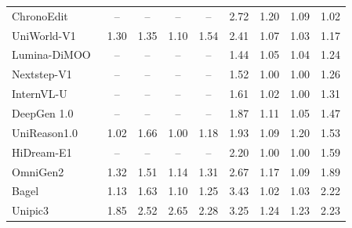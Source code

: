 \documentclass{llmxive}
\begin{document}
\begin{table}[t]
{\begin{tabular}{l|cccc|cccc}
            ChronoEdit~\cite{wu2025chronoedit}
            & -- & -- & -- & --
            & 2.72 & 1.20 & 1.09
            & \cellcolor[HTML]{C8C8C8}1.02 \\

            UniWorld-V1~\cite{lin2025uniworld}
            & 1.30 & 1.35 & 1.10 & \cellcolor[HTML]{C8C8C8}1.54 & 2.41 & 1.07 & 1.03
            & \cellcolor[HTML]{C8C8C8}1.17 \\

            Lumina-DiMOO~\cite{xin2025lumina}
            & -- & -- & -- & --
            & 1.44 & 1.05 & 1.04
            & \cellcolor[HTML]{C8C8C8}1.24 \\

            
            Nextstep-V1~\cite{han2025nextstep}
            & -- & -- & -- & --
            & 1.52 & 1.00 & 1.00
            & \cellcolor[HTML]{C8C8C8}1.26 \\

            InternVL-U~\cite{tian2026internvl}
            & -- & -- & -- & --
            & 1.61 & 1.02 & 1.00
            & \cellcolor[HTML]{C8C8C8}1.31 \\

            DeepGen 1.0~\cite{wang2026deepgen}
            & -- & -- & -- & --
            & 1.87 & 1.11 & 1.05
            & \cellcolor[HTML]{C8C8C8}1.47 \\

            UniReason1.0~\cite{wang2026unireason}
            & 1.02 & 1.66 & 1.00 & \cellcolor[HTML]{C8C8C8}1.18 & 1.93 & 1.09 & 1.20
            & \cellcolor[HTML]{C8C8C8}1.53 \\

            HiDream-E1~\cite{cai2025hidream}
            & -- & -- & -- & --
            & 2.20 & 1.00 & 1.00
            & \cellcolor[HTML]{C8C8C8}1.59 \\

            OmniGen2~\cite{wu2025omnigen2}
            & 1.32 & 1.51 & 1.14 & \cellcolor[HTML]{C8C8C8}1.31 & 2.67 & 1.17 & 1.09 
            & \cellcolor[HTML]{C8C8C8}1.89 \\

            Bagel~\cite{deng2025emerging}
            & 1.13 & 1.63 & 1.10 & \cellcolor[HTML]{C8C8C8}1.25 & 3.43 & 1.02 & 1.03
            & \cellcolor[HTML]{C8C8C8}2.22 \\

            
            Unipic3~\cite{wei2026skywork}
            & 1.85 & 2.52 & 2.65 & \cellcolor[HTML]{C8C8C8}2.28 & 3.25 & 1.24 & 1.23
            & \cellcolor[HTML]{C8C8C8}2.23 \\


\end{tabular}}
\end{table}
\end{document}
